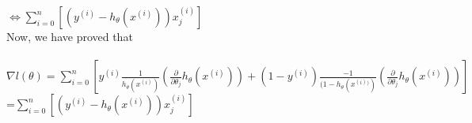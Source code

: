 \documentclass[11pt, oneside]{article}   	%
\begin{document}
\begin{Large}
$\Longleftrightarrow\sum_{i=0}^n[(y^{(i)}-h_\theta(x^{(i)}))x^{(i)}_{j} ] $\\

Now, we have proved that \\
\\$\nabla l (\theta)=\sum_{i=0}^n[y^{(i)}\frac{1}{h_\theta(x^{(i)}) } ( \frac{\partial}{\partial \theta_j}h_\theta(x^{(i)}))+(1-y^{(i)} )\frac{-1}{(1-h_\theta (x^{(i))})}( \frac{\partial}{\partial \theta_j}h_\theta(x^{(i)})) ]$\\
=$\sum_{i=0}^n[(y^{(i)}-h_\theta(x^{(i)}))x^{(i)}_{j} ] $\\
   
\end{Large}
\end{document}
